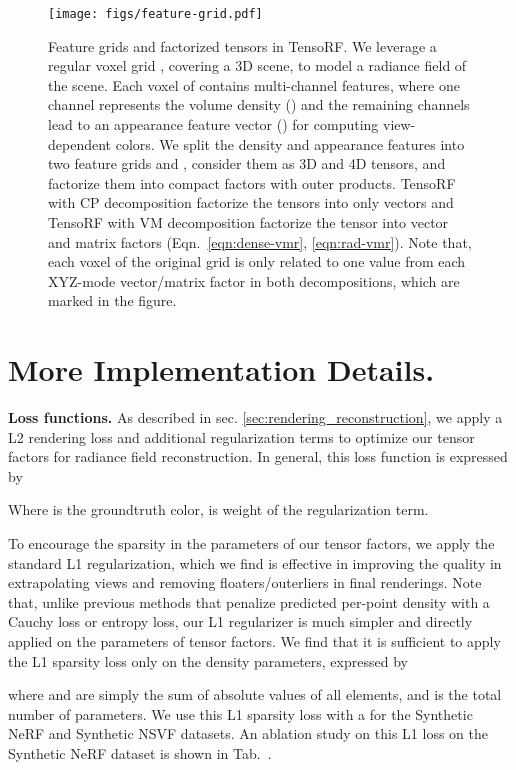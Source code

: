 \documentclass[runningheads]{llncs}
\newcommand{\boldstartspace}[1]{\vspace{0.1in}\noindent\textbf{#1}}
\begin{document}
\begin{figure}[t]
    \centering
    \texttt{[image: figs/feature-grid.pdf]}
\caption{Feature grids and factorized tensors in TensoRF. We leverage a regular voxel grid , covering a 3D scene, to model a radiance field of the scene. Each voxel of  contains multi-channel features, where one channel represents the volume density () and the remaining  channels lead to  an appearance feature vector () for computing view-dependent colors. We split the density and appearance features into two feature grids  and , consider them as 3D and 4D tensors, and factorize them into compact factors with outer products. TensoRF with CP decomposition factorize the tensors into only vectors and TensoRF with VM decomposition factorize the tensor into vector and matrix factors (Eqn.~\ref{eqn:dense-vmr}, \ref{eqn:rad-vmr}). Note that, each voxel of the original grid is only related to one value from each XYZ-mode vector/matrix factor in both decompositions, which are marked in the figure.}
    \label{fig:grids}
\end{figure}

\section{More Implementation Details.}

\boldstartspace{Loss functions.}
As described in sec. \ref{sec:rendering_reconstruction}, we apply a L2 rendering loss and additional regularization terms to optimize our tensor factors for radiance field reconstruction.
In general, this loss function is expressed by



Where  is the groundtruth color,  is weight of the regularization term.

To encourage the sparsity in the parameters of our tensor factors, we apply the standard L1 regularization, which we find is effective in improving the quality in extrapolating views and removing floaters/outerliers in final renderings. Note that, unlike previous methods \cite{hedman2021baking,sun2021direct} that penalize predicted per-point density with a Cauchy loss or entropy loss, our L1 regularizer is much simpler and directly applied on the parameters of tensor factors. 
We find that it is sufficient to  apply the L1 sparsity loss only on the density parameters, expressed by

where  and  are simply the sum of absolute values of all elements, and  is the total number of parameters.
We use this L1 sparsity loss with a  for the Synthetic NeRF and Synthetic NSVF datasets. An ablation study on this L1 loss on the Synthetic NeRF dataset is shown in Tab.~\label{tab:ab_regularization}.
\end{document}
